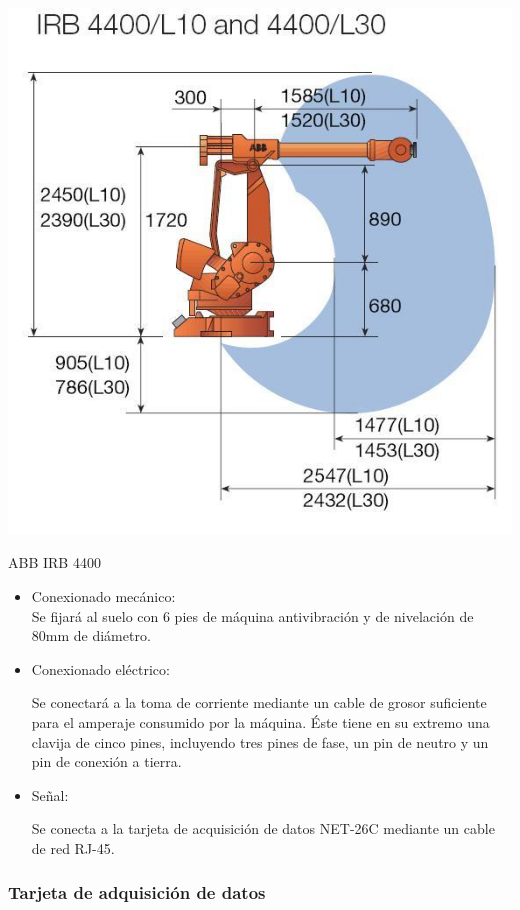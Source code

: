 	\includegraphics[scale=0.4]{Datasheets/9Foto.jpg}
	
	ABB IRB 4400
		\begin{itemize}
				\item{Conexionado mecánico:}\\
				
				Se fijará al suelo con 6 pies de máquina antivibración y de nivelación de 80mm de diámetro.

				\item{Conexionado eléctrico:}

				Se conectará a la toma de corriente mediante un cable de grosor suficiente para el amperaje consumido por la máquina. Éste tiene en su extremo una clavija de cinco pines, incluyendo tres pines de fase, un pin de neutro y un pin de conexión a tierra.  
				
				\item{Señal:}

				Se conecta a la tarjeta de acquisición de datos NET-26C mediante un cable de red RJ-45.
		\end{itemize}

\newpage

	\subsubsection{Tarjeta de adquisición de datos}

